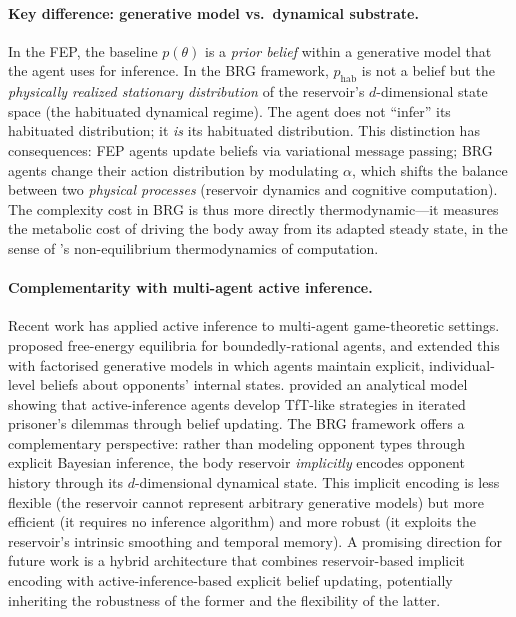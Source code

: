 \documentclass[11pt,a4paper]{article}
\theoremstyle{definition}
\begin{document}
\paragraph{Key difference: generative model vs.\ dynamical substrate.}
In the FEP, the baseline $p(\theta)$ is a \emph{prior belief} within
a generative model that the agent uses for inference.
In the BRG framework, $p_{\mathrm{hab}}$ is not a belief but the
\emph{physically realized stationary distribution} of the reservoir's
$d$-dimensional state space (the habituated dynamical regime).
The agent does not ``infer'' its habituated distribution;
it \emph{is} its habituated distribution.
This distinction has consequences: FEP agents update beliefs via
variational message passing; BRG agents change their action distribution
by modulating $\alpha$, which shifts the balance between two
\emph{physical processes} (reservoir dynamics and cognitive computation).
The complexity cost in BRG is thus more directly thermodynamic---it
measures the metabolic cost of driving the body away from its adapted
steady state, in the sense of \citet{wolpert2024}'s non-equilibrium
thermodynamics of computation.

\paragraph{Complementarity with multi-agent active inference.}
Recent work has applied active inference to multi-agent game-theoretic
settings.  \citet{hyland2024} proposed free-energy equilibria for
boundedly-rational agents, and \citet{ruizserra2025} extended this with
factorised generative models in which agents maintain explicit,
individual-level beliefs about opponents' internal states.
\citet{demekas2024} provided an analytical model showing that
active-inference agents develop TfT-like strategies in iterated
prisoner's dilemmas through belief updating.
The BRG framework offers a complementary perspective:
rather than modeling opponent types through explicit Bayesian inference,
the body reservoir \emph{implicitly} encodes opponent history through its
$d$-dimensional dynamical state.  This implicit encoding is less flexible
(the reservoir cannot represent arbitrary generative models) but more
efficient (it requires no inference algorithm) and more robust
(it exploits the reservoir's intrinsic smoothing and temporal memory).
A promising direction for future work is a hybrid architecture that
combines reservoir-based implicit encoding with active-inference-based
explicit belief updating, potentially inheriting the robustness of the
former and the flexibility of the latter.
\end{document}
